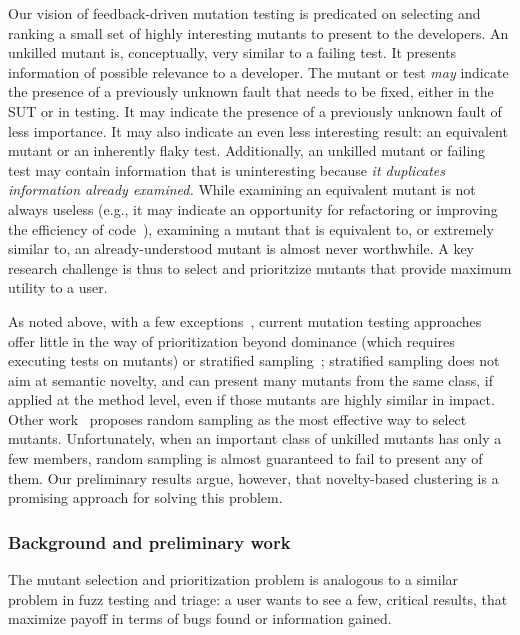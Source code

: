 Our vision of feedback-driven mutation testing is predicated on selecting and ranking a small
set of highly interesting mutants to present to the developers.  An unkilled
mutant is, conceptually, very similar to a failing test.  It presents
information of possible relevance to a developer.  The mutant or test \emph{may}
indicate the presence of a previously unknown fault that needs to be fixed,
either in the SUT or in testing.  It may indicate the presence of a previously
unknown fault of less importance.  It may also indicate an even less interesting
result: an equivalent mutant or an inherently flaky test.  Additionally, an
unkilled mutant or failing test may contain information that is uninteresting
because \emph{it duplicates information already examined.}  While examining an
equivalent mutant is not always useless (e.g., it may indicate an opportunity
for refactoring or improving the efficiency of
code~\cite{ivankovic2018industrial,groce2018verified}), examining a mutant that
is equivalent to, or extremely similar to, an already-understood mutant is
almost never worthwhile.  A key research challenge is thus to select and
prioritzize mutants that provide maximum utility to a user.

As noted above, with a few exceptions~\cite{MutGoogle,FaRM,MutQuality}, current mutation testing approaches
offer little in the way of prioritization beyond dominance (which
requires executing tests on mutants) or stratified sampling~\cite{gopinath2017mutation,MutQuality};
stratified sampling does not aim at semantic novelty, and can present many
mutants from the same class, if applied at the method level, even if those
mutants are highly similar in impact.  Other work~\cite{gopinath2015howhard}
proposes random sampling as the most effective way to select mutants.
Unfortunately, when an important class of unkilled mutants has only a few
members, random sampling is almost guaranteed to fail to present any of them.
Our preliminary results argue, however, that novelty-based clustering is a
promising approach for solving this problem.

\subsubsection{Background and preliminary work}

The mutant selection and prioritization problem is analogous to a similar
problem in fuzz testing and triage: a user wants to see a few,
critical results, that maximize payoff in
terms of bugs found or information gained.

